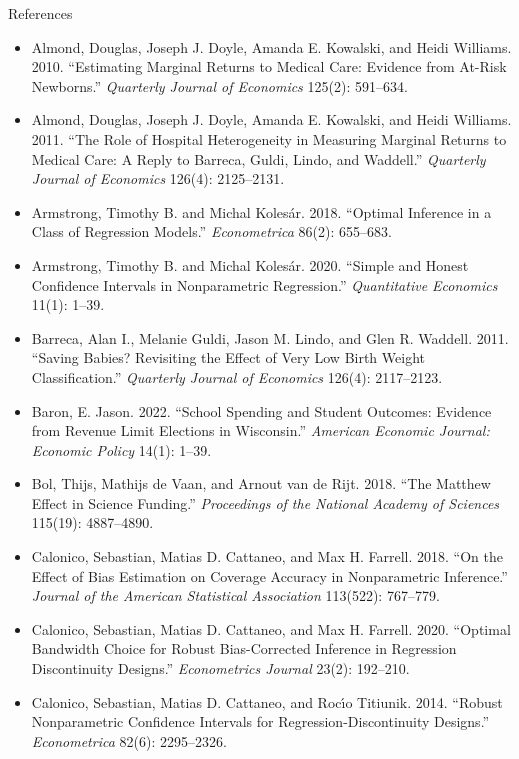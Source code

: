 \documentclass[aspectratio=169,11pt,xcolor=dvipsnames]{beamer}
\begin{document}
\begin{frame}[allowframebreaks,t]{References}
\footnotesize
\begin{itemize}\itemsep2pt
\item Almond, Douglas, Joseph J. Doyle, Amanda E. Kowalski, and Heidi Williams. 2010.
``Estimating Marginal Returns to Medical Care: Evidence from At-Risk Newborns.''
\textit{Quarterly Journal of Economics} 125(2): 591--634.
\item Almond, Douglas, Joseph J. Doyle, Amanda E. Kowalski, and Heidi Williams. 2011.
``The Role of Hospital Heterogeneity in Measuring Marginal Returns to Medical
Care: A Reply to Barreca, Guldi, Lindo, and Waddell.'' \textit{Quarterly Journal
of Economics} 126(4): 2125--2131.
\item Armstrong, Timothy B. and Michal Kolesár. 2018. ``Optimal Inference in a
Class of Regression Models.'' \textit{Econometrica} 86(2): 655--683.
\item Armstrong, Timothy B. and Michal Kolesár. 2020. ``Simple and Honest
Confidence Intervals in Nonparametric Regression.'' \textit{Quantitative
Economics} 11(1): 1--39.
\item Barreca, Alan I., Melanie Guldi, Jason M. Lindo, and Glen R. Waddell. 2011.
``Saving Babies? Revisiting the Effect of Very Low Birth Weight
Classification.'' \textit{Quarterly Journal of Economics} 126(4): 2117--2123.
\item Baron, E. Jason. 2022. ``School Spending and Student Outcomes: Evidence from
Revenue Limit Elections in Wisconsin.'' \textit{American Economic Journal:
Economic Policy} 14(1): 1--39.
\item Bol, Thijs, Mathijs de Vaan, and Arnout van de Rijt. 2018. ``The Matthew
Effect in Science Funding.'' \textit{Proceedings of the National Academy of
Sciences} 115(19): 4887--4890.
\item Calonico, Sebastian, Matias D. Cattaneo, and Max H. Farrell. 2018. ``On the
Effect of Bias Estimation on Coverage Accuracy in Nonparametric Inference.''
\textit{Journal of the American Statistical Association} 113(522): 767--779.
\item Calonico, Sebastian, Matias D. Cattaneo, and Max H. Farrell. 2020. ``Optimal
Bandwidth Choice for Robust Bias-Corrected Inference in Regression
Discontinuity Designs.'' \textit{Econometrics Journal} 23(2): 192--210.
\item Calonico, Sebastian, Matias D. Cattaneo, and Roc\'{\i}o Titiunik. 2014.
``Robust Nonparametric Confidence Intervals for Regression-Discontinuity
Designs.'' \textit{Econometrica} 82(6): 2295--2326.

\end{itemize}
\end{frame}
\end{document}
